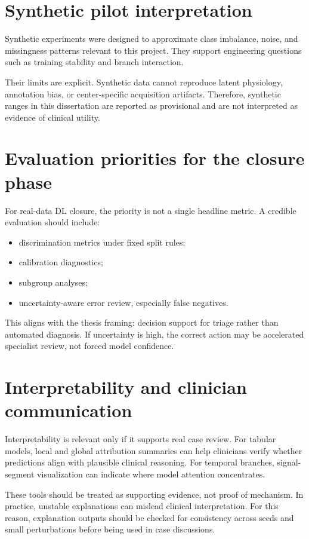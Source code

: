 \section{Synthetic pilot interpretation}
Synthetic experiments were designed to approximate class imbalance, noise, and missingness patterns relevant to this project. They support engineering questions such as training stability and branch interaction.

Their limits are explicit. Synthetic data cannot reproduce latent physiology, annotation bias, or center-specific acquisition artifacts. Therefore, synthetic ranges in this dissertation are reported as provisional and are not interpreted as evidence of clinical utility.

\section{Evaluation priorities for the closure phase}
For real-data DL closure, the priority is not a single headline metric. A credible evaluation should include:
\begin{itemize}[leftmargin=1.2cm]
    \item discrimination metrics under fixed split rules;
    \item calibration diagnostics;
    \item subgroup analyses;
    \item uncertainty-aware error review, especially false negatives.
\end{itemize}

This aligns with the thesis framing: decision support for triage rather than automated diagnosis. If uncertainty is high, the correct action may be accelerated specialist review, not forced model confidence.

\section{Interpretability and clinician communication}
Interpretability is relevant only if it supports real case review. For tabular models, local and global attribution summaries can help clinicians verify whether predictions align with plausible clinical reasoning. For temporal branches, signal-segment visualization can indicate where model attention concentrates.

These tools should be treated as supporting evidence, not proof of mechanism. In practice, unstable explanations can mislead clinical interpretation. For this reason, explanation outputs should be checked for consistency across seeds and small perturbations before being used in case discussions.

